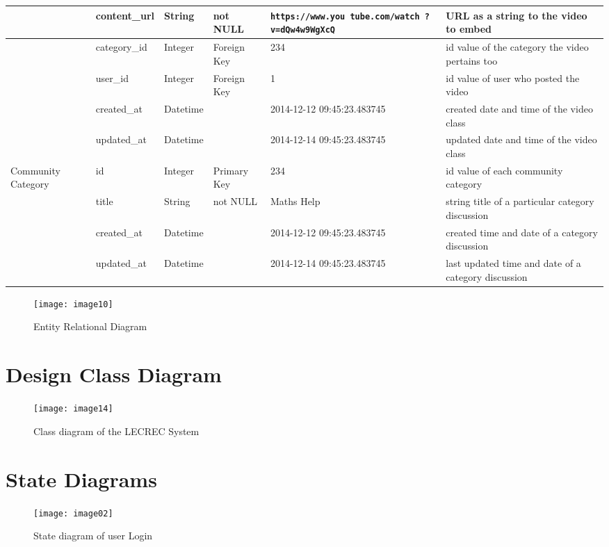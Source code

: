 \documentclass{article}
\begin{document}
\begin{flushleft}
\begin{tabular}{| p{1.6cm} | p{3cm} | l | p{2cm} | p{3cm} | p{4cm} |}
& content\_url & String & not NULL & \texttt{https://www.you tube.com/watch ?v=dQw4w9WgXcQ} & URL as a string to the video to embed \\ \hline
& category\_id & Integer & Foreign Key & 234 & id value of the category the video pertains too \\ \hline
& user\_id & Integer & Foreign Key & 1 & id value of user who posted the video \\ \hline
& created\_at & Datetime & & 2014-12-12 09:45:23.483745 & created date and time of the video class \\ \hline
& updated\_at & Datetime & & 2014-12-14 09:45:23.483745 & updated date and time of the video class \\ \hline
Community Category & id & Integer & Primary Key & 234 & id value of each community category \\ \hline
& title & String & not NULL & Maths Help & string title of a particular category discussion \\ \hline
& created\_at & Datetime & & 2014-12-12 09:45:23.483745 & created time and date of a category discussion  \\ \hline
& updated\_at & Datetime & & 2014-12-14 09:45:23.483745 & last updated time and date of a category discussion \\ \hline
\end{tabular}
\end{flushleft}

\clearpage
\begin{figure}[h!]
\centering
\texttt{[image: image10]}
\caption{Entity Relational Diagram}
\end{figure}

\clearpage
\section{Design Class Diagram}
\begin{figure}[h!]
\centering
\texttt{[image: image14]}
\caption{Class diagram of the LECREC System}
\end{figure}

\clearpage
\section{State Diagrams}
\begin{figure}[h!]
\centering
\texttt{[image: image02]}
\caption{State diagram of user Login}
\end{figure}
\end{document}

